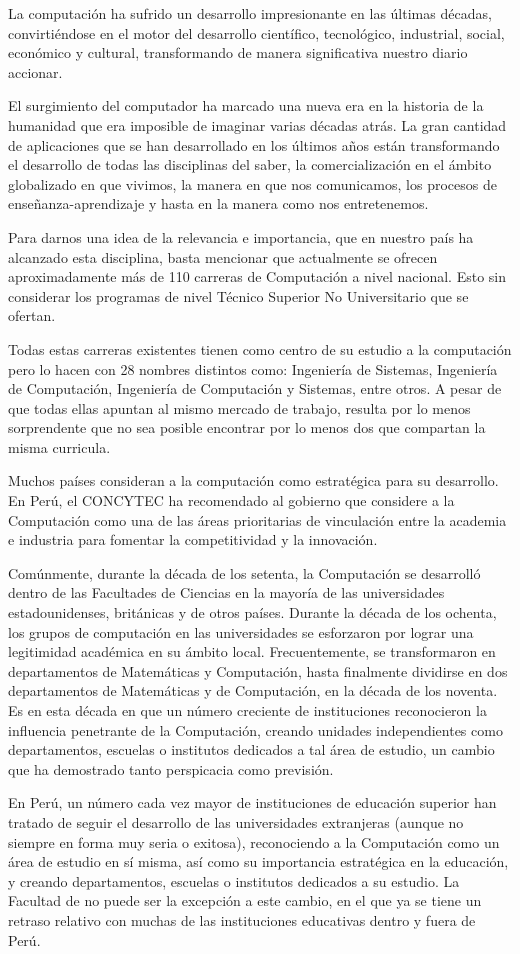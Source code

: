 La computación ha sufrido un desarrollo impresionante en las últimas décadas, convirtiéndose en 
el motor del desarrollo científico, tecnológico, industrial, social, económico y cultural, 
transformando de manera significativa nuestro diario accionar.

El surgimiento del computador ha marcado una nueva era en la historia de la humanidad que era 
imposible de imaginar varias décadas atrás. La gran cantidad de aplicaciones que se han desarrollado 
en los últimos años están transformando el desarrollo de todas las disciplinas del saber, 
la comercialización en el ámbito globalizado en que vivimos, la manera en que nos comunicamos, 
los procesos de enseñanza-aprendizaje y hasta en la manera como nos entretenemos.

Para darnos una idea de la relevancia e importancia, que en nuestro país ha alcanzado esta 
disciplina, basta mencionar que actualmente se ofrecen aproximadamente más de 110 carreras de Computación a nivel nacional. 
Esto sin considerar los programas de nivel Técnico Superior No Universitario que se ofertan.

Todas estas carreras existentes tienen como centro de su estudio a la computación pero lo 
hacen con 28 nombres distintos como: Ingeniería de Sistemas, Ingeniería de Computación, 
Ingeniería de Computación y Sistemas, entre otros. A pesar de que todas ellas apuntan al mismo 
mercado de trabajo, resulta por lo menos sorprendente que no sea posible encontrar por lo menos dos 
que compartan la misma curricula.

Muchos países consideran a la computación como estratégica para su desarrollo. En Perú, 
el \ac{CONCYTEC} ha recomendado al gobierno que considere a la Computación como una de las 
áreas prioritarias de vinculación entre la academia e industria para fomentar la 
competitividad y la innovación.

Comúnmente, durante la década de los setenta, la Computación se desarrolló dentro 
de las Facultades de Ciencias en la mayoría de las universidades estadounidenses, 
británicas y de otros países. Durante la década de los ochenta, los grupos de 
computación en las universidades se esforzaron por lograr una legitimidad académica 
en su ámbito local. Frecuentemente, se transformaron en departamentos de Matemáticas y 
Computación, hasta finalmente dividirse en dos departamentos de Matemáticas y de 
Computación, en la década de los noventa. Es en esta década en que un número 
creciente de instituciones reconocieron la influencia penetrante de la Computación, 
creando unidades independientes como departamentos, escuelas o institutos dedicados a 
tal área de estudio, un cambio que ha demostrado tanto perspicacia como previsión. 

En Perú, un número cada vez mayor de instituciones de educación superior han 
tratado de seguir el desarrollo de las universidades extranjeras (aunque no siempre en 
forma muy seria o exitosa), reconociendo a la Computación como un área de estudio 
en sí misma, así como su importancia estratégica en la educación, y creando 
departamentos, escuelas o institutos dedicados a su estudio. La Facultad de \FacultadName 
no puede ser la excepción a este cambio, en el que ya se tiene un retraso relativo con 
muchas de las instituciones educativas dentro y fuera de Perú.
